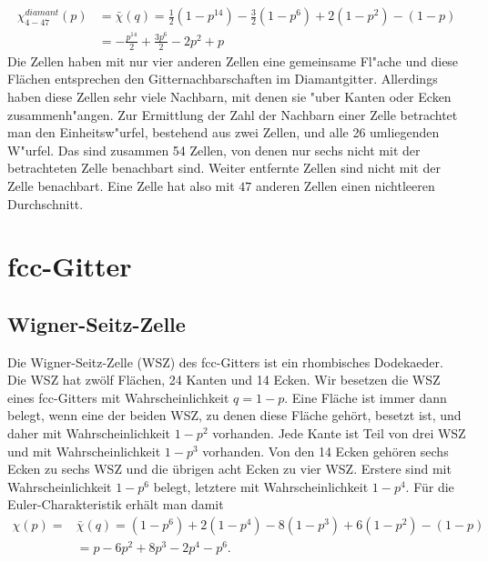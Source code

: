 \begin{equation}
  \begin{split}
  \chi^{diamant}_{4-47}(p) & = \bar{\chi}(q)=\frac{1}{2}(1-p^{14})-\frac{3}{2}(1-p^6)+2(1-p^2)-(1-p) \\
  &= -\frac{p^{14}}{2}+\frac{3p^6}{2}-2p^2+p
\end{split}
\end{equation}
   Die Zellen haben mit nur vier anderen Zellen eine gemeinsame 
   Fl"ache und diese Fl\"achen entsprechen den Gitternachbarschaften 
   im Diamantgitter. Allerdings haben diese Zellen sehr viele 
   Nachbarn, mit denen sie "uber Kanten oder Ecken zusammenh"angen. Zur Ermittlung der Zahl der Nachbarn einer Zelle betrachtet man 
   den Einheitsw"urfel, bestehend aus zwei Zellen, und alle 26 
   umliegenden W"urfel. Das sind zusammen 54 Zellen, von denen nur
   sechs nicht mit der betrachteten Zelle benachbart sind. Weiter 
   entfernte Zellen sind nicht mit der Zelle benachbart. Eine Zelle hat also mit $47$ anderen Zellen einen nichtleeren Durchschnitt.
   

\section{fcc-Gitter}
\label{sec:appfcc}
\subsection{Wigner-Seitz-Zelle}
Die Wigner-Seitz-Zelle (WSZ) des fcc-Gitters ist ein rhombisches Dodekaeder. Die WSZ hat zw\"olf Fl\"achen, 24 Kanten und 14 Ecken. 
Wir besetzen die WSZ eines fcc-Gitters mit Wahrscheinlichkeit $q=1-p$. Eine Fl\"ache ist immer dann belegt, wenn eine der beiden WSZ, zu denen diese Fl\"ache geh\"ort, besetzt ist, und daher mit Wahrscheinlichkeit $1-p^2$ vorhanden. Jede Kante ist Teil von drei WSZ und mit Wahrscheinlichkeit $1-p^3$ vorhanden. Von den 14 Ecken geh\"oren sechs Ecken zu sechs WSZ und die \"ubrigen acht Ecken zu vier WSZ. Erstere sind mit Wahrscheinlichkeit $1-p^6$ belegt, letztere mit Wahrscheinlichkeit $1-p^4$. F\"ur die Euler-Charakteristik erh\"alt man damit
\begin{equation}
  \begin{split}
  \chi(p)= & \bar{\chi}(q)=(1-p^6)+2(1-p^4)-8(1-p^3)+6(1-p^2)-(1-p)\\
  &=p-6p^2+8p^3-2p^4-p^6.
\end{split}
\end{equation}


